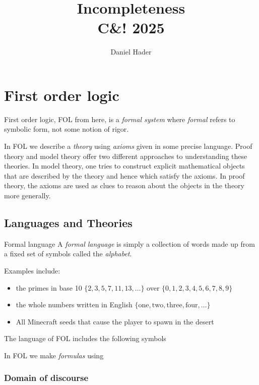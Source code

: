 \documentclass[12pt]{article}
\title{Incompleteness\\\large C\&! 2025}
\author{Daniel Hader}
\date{}
\begin{document}
	\maketitle
	
	\section{First order logic}
	
	
	First order logic, FOL from here, is a \emph{formal system} where \emph{formal} refers to symbolic form, not some notion of rigor.
	
	In FOL we describe a \emph{theory} using \emph{axioms} given in some precise language. Proof theory and model theory offer two different approaches to understanding these theories. In model theory, one tries to construct explicit mathematical objects that are described by the theory and hence which satisfy the axioms. In proof theory, the axioms are used as clues to reason about the objects in the theory more generally. 
	
	\subsection{Languages and Theories}
	
	\begin{definition}{Formal language}{}
		A \emph{formal language} is simply a collection of words made up from a fixed set of symbols called the \emph{alphabet}. 
	\end{definition}
	
	\noindent Examples include:
	\begin{itemize}[itemsep=0pt]
		\item the primes in base 10 $\{2, 3, 5, 7, 11, 13, \ldots \}$ over $\{0,1,2,3,4,5,6,7,8,9\}$
		\item the whole numbers written in English $\{\text{one},\text{two},\text{three},\text{four},\ldots\}$
		\item All Minecraft seeds that cause the player to spawn in the desert
	\end{itemize}
	
	\noindent The language of FOL includes the following symbols
	
	\noindent In FOL we make \emph{formulas} using 
	
	\subsubsection{Domain of discourse}
	
\end{document}
